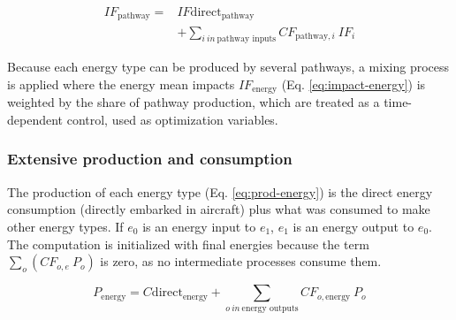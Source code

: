 \documentclass[
]{kaohandt}
\begin{document}

\begin{equation}
\label{eq:impact-pathway}
\begin{split}
    IF_{\text{pathway}}= & IF\text{direct}_{\text{pathway}}\\
    &+\sum_{i\ in\ \text{pathway inputs}}CF_{\text{pathway}, i}\ IF_i
\end{split}
\end{equation}


Because each energy type can be produced by several pathways, a mixing process is applied where the energy mean impacts $IF_{\text{energy}}$ (Eq. \ref{eq:impact-energy}) is weighted by the share of pathway production, which are treated as a time-dependent control, used as optimization variables.

\subsubsection{Extensive production and consumption}

The production of each energy type (Eq. \ref{eq:prod-energy}) is the direct energy consumption (directly embarked in aircraft) plus what was consumed to make other energy types. If $e_0$ is an energy input to $e_1$, $e_1$ is an energy output to $e_0$. The computation is initialized with final energies because the term $\sum_{o}(CF_{o, e}\ P_o)$ is zero, as no intermediate processes consume them.

\begin{equation}
    P_{\text{energy}}=C\text{direct}_{\text{energy}} + \sum_{o\ in\ \text{energy outputs}}CF_{o, \text{energy}}\ P_o
    \label{eq:prod-energy}
\end{equation}

\end{document}
